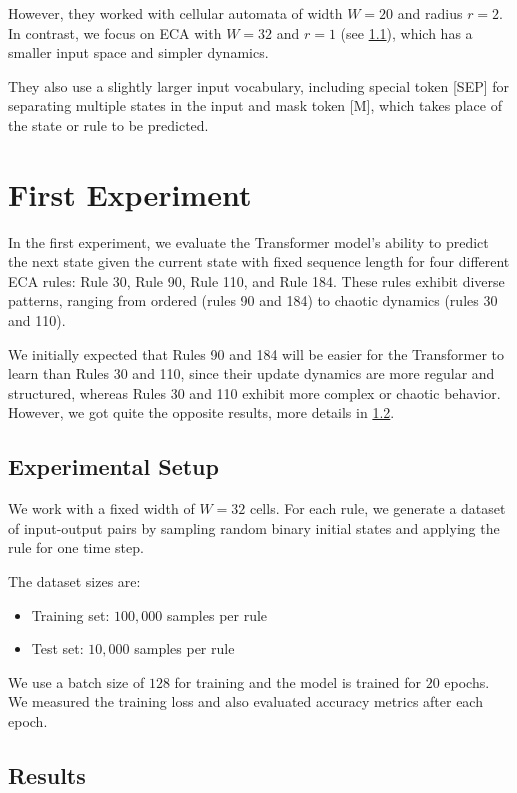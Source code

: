 \documentclass[runningheads]{llncs}
\begin{document}
However, they worked with cellular automata of width $W = 20$ and radius $r = 2$. In contrast, we focus on ECA with $W = 32$ and $r = 1$ (see \cref{sec:experimental-setup}), which has a smaller input space and simpler dynamics.

They also use a slightly larger input vocabulary, including special token [SEP] for separating multiple states in the input and mask token [M], which takes place of the state or rule to be predicted.


\section{First Experiment}
\label{sec:first-experiment}

In the first experiment, we evaluate the Transformer model's ability to predict the next state given the current state with fixed sequence length for four different ECA rules: Rule 30, Rule 90, Rule 110, and Rule 184. These rules exhibit diverse patterns, ranging from ordered (rules 90 and 184) to chaotic dynamics (rules 30 and 110).

We initially expected that Rules 90 and 184 will be easier for the Transformer to learn than Rules 30 and 110, since their update dynamics are more regular and structured, whereas Rules 30 and 110 exhibit more complex or chaotic behavior. However, we got quite the opposite results, more details in \cref{sec:results}.


\subsection{Experimental Setup}
\label{sec:experimental-setup}

We work with a fixed width of $W = 32$ cells. For each rule, we generate a dataset of input-output pairs by sampling random binary initial states and applying the rule for one time step.

The dataset sizes are:
\begin{itemize}
    \item Training set: $100{,}000$ samples per rule
    \item Test set: $10{,}000$ samples per rule
\end{itemize}

We use a batch size of $128$ for training and the model is trained for $20$ epochs. We measured the training loss and also evaluated accuracy metrics after each epoch.


\subsection{Results}
\label{sec:results}
\end{document}
